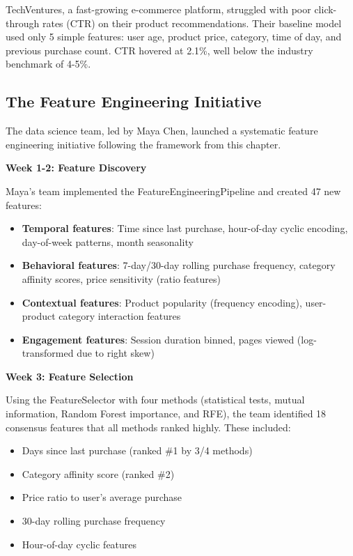 TechVentures, a fast-growing e-commerce platform, struggled with poor click-through rates (CTR) on their product recommendations. Their baseline model used only 5 simple features: user age, product price, category, time of day, and previous purchase count. CTR hovered at 2.1\%, well below the industry benchmark of 4-5\%.

\subsection{The Feature Engineering Initiative}

The data science team, led by Maya Chen, launched a systematic feature engineering initiative following the framework from this chapter.

\textbf{Week 1-2: Feature Discovery}

Maya's team implemented the FeatureEngineeringPipeline and created 47 new features:

\begin{itemize}
    \item \textbf{Temporal features}: Time since last purchase, hour-of-day cyclic encoding, day-of-week patterns, month seasonality
    \item \textbf{Behavioral features}: 7-day/30-day rolling purchase frequency, category affinity scores, price sensitivity (ratio features)
    \item \textbf{Contextual features}: Product popularity (frequency encoding), user-product category interaction features
    \item \textbf{Engagement features}: Session duration binned, pages viewed (log-transformed due to right skew)
\end{itemize}

\textbf{Week 3: Feature Selection}

Using the FeatureSelector with four methods (statistical tests, mutual information, Random Forest importance, and RFE), the team identified 18 consensus features that all methods ranked highly. These included:

\begin{itemize}
    \item Days since last purchase (ranked \#1 by 3/4 methods)
    \item Category affinity score (ranked \#2)
    \item Price ratio to user's average purchase
    \item 30-day rolling purchase frequency
    \item Hour-of-day cyclic features
\end{itemize}

